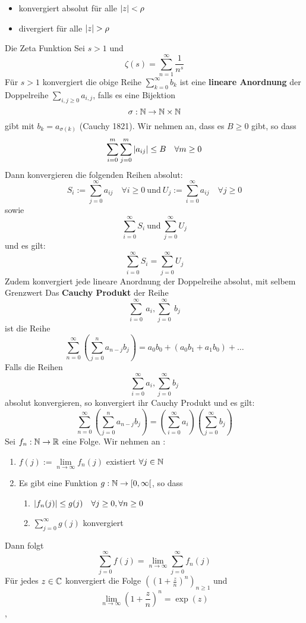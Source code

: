 \begin{itemize}
    \item konvergiert absolut für alle $\left\lvert z \right\rvert < \rho$ 
    \item divergiert für alle $\left\lvert z \right\rvert > \rho$
\end{itemize}
\Def[] Die Zeta Funktion
Sei \( s > 1\) und
\[ \zeta(s) = \sum_{n=1}^{\infty} \frac{1}{n^s}\]
Für \(s > 1\) konvergiert die obige Reihe
\Def[2.58] \(\sum_{k=0}^{\infty} b_k \) ist eine \textbf{lineare Anordnung} der Doppelreihe \(\sum_{i,j \geq 0} a_{i,j}\), falls es eine Bijektion \[\sigma : \mathbb{N} \rightarrow \mathbb{N} \times \mathbb{N} \] gibt mit \(b_k = a_{\sigma(k)}\) \newline
\Satz[2.59] (Cauchy 1821). Wir nehmen an, dass es \(B \geq 0\) gibt, so dass
\[\sum_{i=0}^{m}\sum_{j=0}^{m}\left\lvert a_{ij} \right\rvert \leq B \quad \forall m \geq 0\]
Dann konvergieren die folgenden Reihen absolut:
\[S_i := \sum_{j=0}^\infty a_{ij} \quad \forall i \geq 0 \  \text{und} \  U_j := \sum_{i=0}^{\infty}a_{ij} \quad \forall j \geq 0\]
sowie
\[\sum_{i=0}^\infty S_i \ \text{und} \ \sum_{j=0}^\infty U_j\]
und es gilt:
\[\sum_{i=0}^\infty S_i  =  \sum_{j=0}^\infty U_j\]
Zudem konvergiert jede lineare Anordnung der Doppelreihe absolut, mit selbem Grenzwert \newline
\Def[2.60] Das \textbf{Cauchy Produkt} der Reihe
\[\sum_{i=0}^\infty\ a_i, \sum_{j=0}^\infty\ b_j\]
ist die Reihe
\[\sum_{n=0}^\infty ( \sum_{j=0}^n a_{n-j}b_j )= a_0b_0 + (a_0b_1 + a_1b_0) + \dots \] \newline
\Satz[2.62] Falls die Reihen
\[\sum_{i=0}^\infty a_i , \sum_{j=0}^\infty b_j\]
absolut konvergieren, so konvergiert ihr Cauchy Produkt und es gilt:
\[\sum_{n=0}^{\infty} (\sum_{j=0}^n a_{n-j}b_j) = (\sum_{i=0}^{\infty} a_i) (\sum_{j=0}^{\infty} b_j)\]
\Satz[2.64]  Sei \( f_n : \mathbb{N} \rightarrow \mathbb{R} \) eine Folge. Wir nehmen an :
\begin{enumerate}
    \item [1] \(f(j) := \lim\limits_{n \rightarrow \infty} f_n(j)\) existiert \(\forall j \in \mathbb{N}\)
    \item [2] Es gibt eine Funktion \(g: \mathbb{N} \rightarrow [0, \infty[\), so dass
    \begin {enumerate}
    \item [2.1] \(\left\lvert f_n(j) \right\rvert \leq g(j) \quad \forall j \geq 0, \forall n \geq 0\)
    \item [2.2] \(\sum_{j=0}^\infty g(j)\) konvergiert
    \end{enumerate}
\end{enumerate}
Dann folgt
\[\sum_{j=0}^\infty f(j) = \lim\limits_{n \rightarrow \infty} \sum_{j=0}^\infty f_n(j)\]
\Korollar[2.65] Für jedes \(z \in \mathbb{C} \) konvergiert die Folge \(((1 + \frac{z}{n})^n)_{n \geq 1}\) und
\[\lim\limits_{n \rightarrow \infty} (1 + \frac{z}{n})^n = \exp(z)\]
\sep